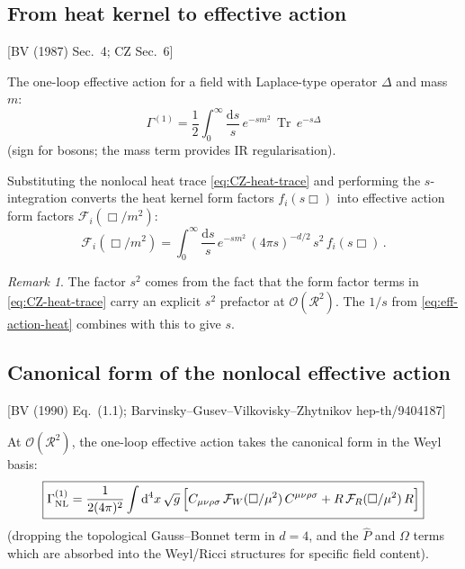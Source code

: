 \documentclass[12pt,a4paper]{article}
\theoremstyle{definition}
\theoremstyle{remark}
\newtheorem{remark}[proposition]{Remark}
\newcommand{\Tr}{\operatorname{Tr}}
\newcommand{\dd}{\mathrm{d}}
\newcommand{\fromlit}[1]{\textcolor{blue!70!black}{\textsf{[#1]}}}
\begin{document}
\subsection{From heat kernel to effective action}

\fromlit{BV (1987) Sec.~4; CZ Sec.~6}

The one-loop effective action for a field with Laplace-type operator
$\Delta$ and mass $m$:
\begin{equation}
  \Gamma^{(1)} = \frac{1}{2}\int_0^\infty\frac{\dd s}{s}\,
  e^{-sm^2}\,\Tr\,e^{-s\Delta}
  \label{eq:eff-action-heat}
\end{equation}
(sign for bosons; the mass term provides IR regularisation).

Substituting the nonlocal heat trace \eqref{eq:CZ-heat-trace} and
performing the $s$-integration converts the heat kernel form factors
$f_i(s\Box)$ into effective action form factors $\mathcal{F}_i(\Box/m^2)$:
\begin{equation}
  \mathcal{F}_i(\Box/m^2)
  = \int_0^\infty \frac{\dd s}{s}\,e^{-sm^2}\,(4\pi s)^{-d/2}\,
  s^2\, f_i(s\Box)\,.
  \label{eq:eff-action-ff}
\end{equation}

\begin{remark}
The factor $s^2$ comes from the fact that the form factor terms in
\eqref{eq:CZ-heat-trace} carry an explicit $s^2$ prefactor at
$\mathcal{O}(\mathcal{R}^2)$.  The $1/s$ from
\eqref{eq:eff-action-heat} combines with this to give $s$.
\end{remark}


\subsection{Canonical form of the nonlocal effective action}

\fromlit{BV (1990) Eq.~(1.1); Barvinsky--Gusev--Vilkovisky--Zhytnikov
hep-th/9404187}

At $\mathcal{O}(\mathcal{R}^2)$, the one-loop effective action takes
the canonical form in the Weyl basis:
\begin{equation}
  \boxed{
  \Gamma^{(1)}_{\text{NL}}
  = \frac{1}{2(4\pi)^2}\int\dd^4 x\,\sqrt{g}\,\Bigl[
  C_{\mu\nu\rho\sigma}\,\mathcal{F}_W(\Box/\mu^2)\,C^{\mu\nu\rho\sigma}
  + R\,\mathcal{F}_R(\Box/\mu^2)\,R
  \Bigr]
  }
  \label{eq:BV-eff-action}
\end{equation}
(dropping the topological Gauss--Bonnet term in $d=4$, and the $\hat{P}$
and $\Omega$ terms which are absorbed into the Weyl/Ricci structures
for specific field content).
\end{document}
